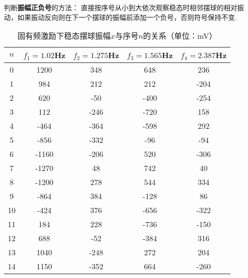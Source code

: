\documentclass{ctexart}
\begin{document}
 判断\textbf{振幅正负号}的方法： 直接按序号从小到大依次观察稳态时相邻摆球的相对振动，如果振动反向则在下一个摆球的振幅前添加一个负号，否则符号保持不变.\\
\begin{table}[!htbp]
  \small
  \centering
  \caption{固有频激励下稳态摆球振幅$x$与序号$n$的关系（单位：mV）}\vspace{0.3em} \label{tab:aStrangeTable}%
  \begin{tabular}{c|cccc}
  \toprule
   $n$& $f_1=1.02$Hz	&	$f_2=1.275$Hz	&	$f_3=1.565$Hz		&$f_4=2.387$Hz\\
  \midrule
   0& 1200	&	348	&	648	&	236\\
    1& 984	&	212	&	212	&	-204\\
    2& 620	&	-50	&	-400	&	-254\\
    3& 112	&	-246	&	-720	&	158\\
    4& -464	&	-364	&	-598	&	292\\
    5& -856	&	-332	&	-96	&	-94\\
    6& -1160	&	-206	&	520	&	-306\\
    7& -1270	&	48	&	742	&	40\\
    8& -1200	&	278	&	544	&	334\\
    9& -864	&	384	&	-128	&	86\\
    10& -424	&	376	&	-656	&	-322\\
    11& 184	&	228	&	-736	&	-150\\
    12& 688	&	-52	&	-384	&	316\\
    13& 1040	&	-248	&	272	&	204\\
    14& 1150	&	-352	&	664	&	-260\\
  \bottomrule
  \end{tabular}
  \end{table}
\end{document}

